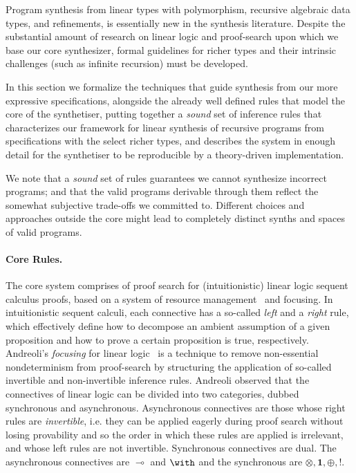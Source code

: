\documentclass{llncs}
\newcommand{\lolli}{\multimap}
\newcommand{\tensor}{\otimes}
\newcommand{\bang}{{!}}
\newcommand{\mypara}[1]{\paragraph{\textbf{#1}.}}
\begin{document}
Program synthesis from linear types with polymorphism, recursive
algebraic data types, and refinements, is essentially new in the synthesis 
literature. Despite the substantial amount of research on linear logic and
proof-search upon which we base our core synthesizer, formal guidelines for
richer types and their intrinsic challenges (such as infinite
recursion) must be developed.

In this section we formalize  the techniques that guide
synthesis from our more expressive specifications, alongside the already well
defined rules that model the core of the synthetiser, putting together a
\emph{sound} set of inference rules that characterizes our framework
for linear synthesis of
recursive programs from specifications with the select richer types,
and describes the system in enough detail for the synthetiser to be reproducible
by a theory-driven implementation.

We note that a \emph{sound} set of rules guarantees we cannot synthesize
incorrect programs; and that the valid programs derivable through them
reflect the somewhat subjective trade-offs we committed to. Different
choices and approaches outside the core might lead to completely
distinct synths and spaces of valid programs.


\mypara{Core Rules} The core system comprises of proof search for
(intuitionistic) linear logic sequent calculus proofs, based on a system of
resource management~\cite{resman} and focusing.
%
%
In intuitionistic sequent calculi, each connective has a so-called \emph{left}
and a \emph{right} rule, which effectively define how to decompose an ambient
assumption of a given proposition and how to prove a certain proposition is
true, respectively.  Andreoli's \emph{focusing} for linear logic~\cite{Andreolli
focusing} is a technique to remove non-essential nondeterminism from
proof-search by structuring the application of so-called invertible and
non-invertible inference rules. Andreoli observed that the
connectives of linear logic can be divided into two categories, dubbed
synchronous and asynchronous. Asynchronous connectives are those whose
right rules are \emph{invertible}, i.e. they can be applied eagerly
during proof search without losing provability and so the order in
which these rules are applied is irrelevant, and whose left rules
are not invertible. Synchronous connectives are dual. The asynchronous  
connectives are $\lolli$ and $\with$ and the synchronous are
$\tensor,\textbf{1},\oplus,\bang$.
\end{document}
